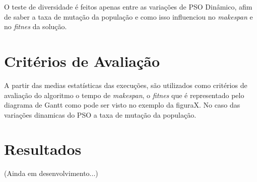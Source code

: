     O teste de diversidade é feitos apenas entre as variações de PSO Dinâmico, afim de saber a taxa de mutação da população e como isso influenciou no \textit{makespan} e no \textit{fitnes} da solução.



\section{Critérios de Avaliação}
    A partir das medias estatísticas das execuções, são utilizados como critérios de avaliação do algoritmo o tempo de \textit{makespan}, o \textit{fitnes} que é representado pelo diagrama de Gantt como pode ser visto no exemplo da figuraX. No caso das variações dinamicas do PSO a taxa de mutação da população.



\section{Resultados}
    (Ainda em desenvolvimento...)









